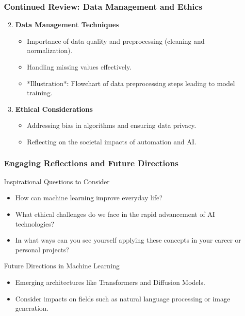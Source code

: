\documentclass[aspectratio=169]{beamer}
\begin{document}
\begin{frame}[fragile]
    \frametitle{Continued Review: Data Management and Ethics}
    \begin{enumerate} \setcounter{enumi}{1}
        \item \textbf{Data Management Techniques}
        \begin{itemize}
            \item Importance of data quality and preprocessing (cleaning and normalization).
            \item Handling missing values effectively.
            \item *Illustration*: Flowchart of data preprocessing steps leading to model training.
        \end{itemize}
        
        \item \textbf{Ethical Considerations}
        \begin{itemize}
            \item Addressing bias in algorithms and ensuring data privacy.
            \item Reflecting on the societal impacts of automation and AI.
        \end{itemize}
    \end{enumerate}
\end{frame}

\begin{frame}[fragile]
    \frametitle{Engaging Reflections and Future Directions}
    \begin{block}{Inspirational Questions to Consider}
        \begin{itemize}
            \item How can machine learning improve everyday life?
            \item What ethical challenges do we face in the rapid advancement of AI technologies?
            \item In what ways can you see yourself applying these concepts in your career or personal projects?
        \end{itemize}
    \end{block}

    \begin{block}{Future Directions in Machine Learning}
        \begin{itemize}
            \item Emerging architectures like Transformers and Diffusion Models.
            \item Consider impacts on fields such as natural language processing or image generation.
        \end{itemize}
    \end{block}
\end{frame}
\end{document}
